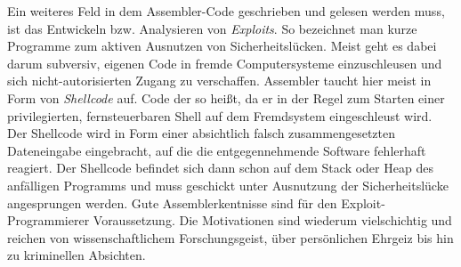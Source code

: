 Ein weiteres Feld in dem Assembler-Code geschrieben und gelesen werden muss, ist das Entwickeln bzw. Analysieren von \emph{Exploits}. So bezeichnet man kurze Programme zum aktiven Ausnutzen von Sicherheitslücken. Meist geht es dabei darum subversiv, eigenen Code in fremde Computersysteme einzuschleusen und sich nicht-autorisierten Zugang zu verschaffen. Assembler taucht hier meist in Form von \emph{Shellcode} auf. Code der so heißt, da er in der Regel zum Starten einer privilegierten, fernsteuerbaren Shell auf dem Fremdsystem eingeschleust wird. Der Shellcode wird in Form einer absichtlich falsch zusammengesetzten Dateneingabe eingebracht, auf die die entgegennehmende Software fehlerhaft reagiert. Der Shellcode befindet sich dann schon auf dem Stack oder Heap des anfälligen Programms und muss geschickt unter Ausnutzung der Sicherheitslücke angesprungen werden. Gute Assemblerkentnisse sind für den Exploit-Programmierer Voraussetzung. Die Motivationen sind wiederum vielschichtig und reichen von wissenschaftlichem Forschungsgeist, über persönlichen Ehrgeiz bis hin zu kriminellen Absichten.
